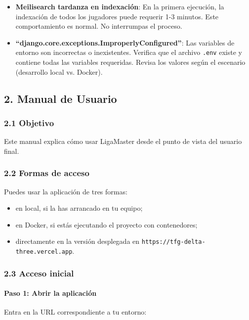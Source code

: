 \begin{itemize}
    \item \textbf{Meilisearch tardanza en indexación}: En la primera ejecución, la indexación de todos los jugadores puede requerir 1-3 minutos. Este comportamiento es normal. No interrumpas el proceso.
        
    \item \textbf{``django.core.exceptions.ImproperlyConfigured''}: Las variables de entorno son incorrectas o inexistentes. Verifica que el archivo \texttt{.env} existe y contiene todas las variables requeridas. Revisa los valores según el escenario (desarrollo local vs. Docker).
\end{itemize}


\subsection*{2. Manual de Usuario}

\subsubsection*{2.1 Objetivo}

Este manual explica cómo usar LigaMaster desde el punto de vista del usuario final.

\subsubsection*{2.2 Formas de acceso}

Puedes usar la aplicación de tres formas:

\begin{itemize}
    \item en local, si la has arrancado en tu equipo;
    \item en Docker, si estás ejecutando el proyecto con contenedores;
    \item directamente en la versión desplegada en \texttt{https://tfg-delta-three.vercel.app}.
\end{itemize}

\subsubsection*{2.3 Acceso inicial}

\paragraph*{Paso 1: Abrir la aplicación}

Entra en la URL correspondiente a tu entorno:

